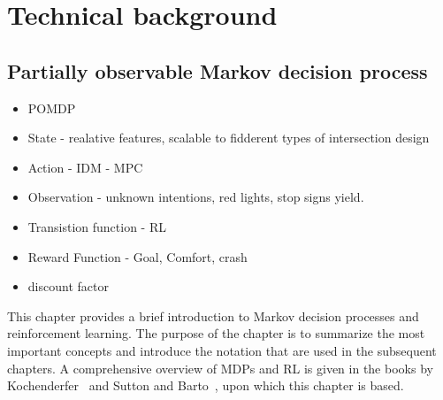 \chapter{Technical background}\label{chapter:background}
%

\section{Partially observable Markov decision process}\label{section:pomdp}

\begin{itemize}
    \item POMDP
    \item State - realative features, scalable to fidderent types of intersection design 
    \item Action - IDM - MPC
    \item Observation - unknown intentions, red lights, stop signs yield. 
    \item Transistion function - RL 
    \item Reward Function - Goal, Comfort, crash
    \item discount factor 
\end{itemize}



This chapter provides a brief introduction to Markov decision processes and reinforcement learning.
The purpose of the chapter is to summarize the most important concepts and introduce the notation that are used in the subsequent chapters. 
A comprehensive overview of MDPs and RL is given in the books by Kochenderfer~\cite{Kochenderfer2015} and Sutton and Barto~\cite{Sutton2018}, upon which this chapter is based.


